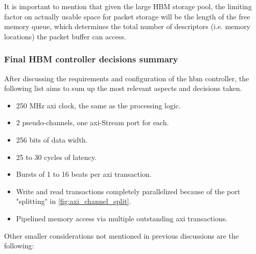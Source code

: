It is important to mention that given the large HBM storage pool, the limiting factor on actually usable space for packet storage will 
be the length of the free memory queue, which determines the total number of descriptors (i.e. memory locations) the packet buffer can access.


\subsubsection{Final HBM controller decisions summary}

After discussing the requirements and configuration of the \gls{hbm} controller, the following list aims to sum up the most
relevant aspects and decisions taken.

\begin{itemize}
  \item 250 MHz \gls{axi} clock, the same as the processing logic.
  \item 2 pseudo-channels, one \gls{axi}-Stream port for each.
  \item 256 bits of data width.
  \item 25 to 30 cycles of latency.
  \item Bursts of 1 to 16 beats per \gls{axi} transaction.
  \item Write and read transactions completely parallelized because of the port "splitting" in \ref{fig:axi_channel_split}.
  \item Pipelined memory access via multiple outstanding \gls{axi} transactions.
\end{itemize}

Other smaller considerations not mentioned in previous discussions are the following:

